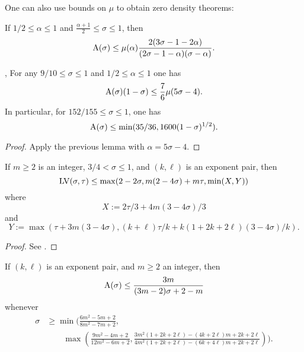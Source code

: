One can also use bounds on $\mu$ to obtain zero density theorems:

\begin{lemma}\label{zero_from_mu}\cite[Theorem 12.3]{montgomery_topics_1971} If $1/2 \leq \alpha \leq 1$ and $\frac{\alpha+1}{2} \leq \sigma \leq 1$, then
$$ \mathrm{A}(\sigma) \leq \mu(\alpha) \frac{2(3\sigma-1-2\alpha)}{(2\sigma-1-\alpha)(\sigma-\alpha)}.$$
\end{lemma}

\begin{corollary}\label{ivic-zero-density-large}\cite{montgomery_topics_1971}, \cite[Theorem 11.3]{ivic} For any $9/10 \leq \sigma \leq 1$ and $1/2 \leq \alpha \leq 1$ one has
    $$ \mathrm{A}(\sigma)(1-\sigma) \leq \frac{7}{6} \mu(5\sigma-4).$$
In particular, for $152/155 \leq \sigma \leq 1$, one has
$$ \mathrm{A}(\sigma) \leq \min( 35/36, 1600 (1-\sigma)^{1/2} ).$$
\end{corollary}

\begin{proof} Apply the previous lemma with $\alpha = 5\sigma-4$.
\end{proof}

\begin{lemma}\label{a-ivt-1}  If $m \geq 2$ is an integer, $3/4 < \sigma \leq 1$, and $(k,\ell)$ is an exponent pair, then
$$ \mathrm{LV}(\sigma,\tau) \leq \max( 2-2\sigma, m(2-4\sigma) + m\tau, \min( X, Y ))$$
where
$$ X := 2\tau/3 + 4m(3-4\sigma)/3$$
and
$$ Y := \max( \tau + 3m(3-4\sigma), (k+\ell)\tau/k + k(1+2k+2\ell)(3-4\sigma)/k).$$
\end{lemma}

\begin{proof}  See \cite[(11.74)]{ivic}.
\end{proof}

\begin{lemma}\label{gzd}\cite[(11.76), (11.77)]{ivic} If $(k,\ell)$ is an exponent pair, and $m \geq 2$ an integer, then
$$ \mathrm{A}(\sigma) \leq \frac{3m}{(3m-2)\sigma + 2 - m}$$
whenever
\begin{align*}
\sigma &\geq \min\biggl( \frac{6m^2-5m+2}{8m^2-7m+2},\\
&\qquad \max\left( \frac{9m^2-4m+2}{12m^2-6m+2}, \frac{3m^2(1+2k+2\ell)-(4k+2\ell)m + 2k+2\ell}{4m^2(1+2k+2\ell)-(6k+4\ell)m + 2k+2\ell} \right) \biggr).
\end{align*}
\end{lemma}

